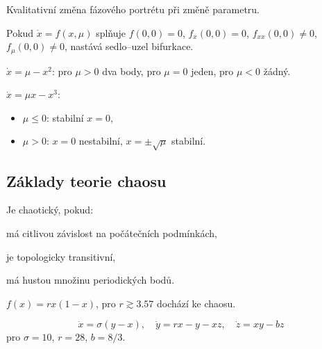 \begin{definition}[Bifurkace]
Kvalitativní změna fázového portrétu při změně parametru.
\end{definition}

\begin{theorem}
Pokud $\dot{x}=f(x,\mu)$ splňuje $f(0,0)=0$, $f_x(0,0)=0$, $f_{xx}(0,0)\ne0$, $f_\mu(0,0)\ne0$, nastává sedlo–uzel bifurkace.
\end{theorem}

\begin{example}
$\dot{x}=\mu-x^2$: pro $\mu>0$ dva body, pro $\mu=0$ jeden, pro $\mu<0$ žádný.
\end{example}

\begin{definition}
$\dot{x}=\mu x-x^3$:
\begin{itemize}
\item $\mu\le0$: stabilní $x=0$,
\item $\mu>0$: $x=0$ nestabilní, $x=\pm\sqrt{\mu}$ stabilní.
\end{itemize}
\end{definition}

\spc

\subsection{Základy teorie chaosu}
\label{sec:zaklady-chaosu}

\begin{definition}
Je chaotický, pokud:
\begin{romanenum}
\item má citlivou závislost na počátečních podmínkách,
\item je topologicky transitivní,
\item má hustou množinu periodických bodů.
\end{romanenum}
\end{definition}

\begin{example}
$f(x)=rx(1-x)$, pro $r\gtrsim3.57$ dochází ke chaosu.
\end{example}

\begin{example}
\[
\dot{x}=\sigma(y-x),\quad \dot{y}=rx-y-xz,\quad \dot{z}=xy-bz
\]
pro $\sigma=10$, $r=28$, $b=8/3$.
\end{example}

